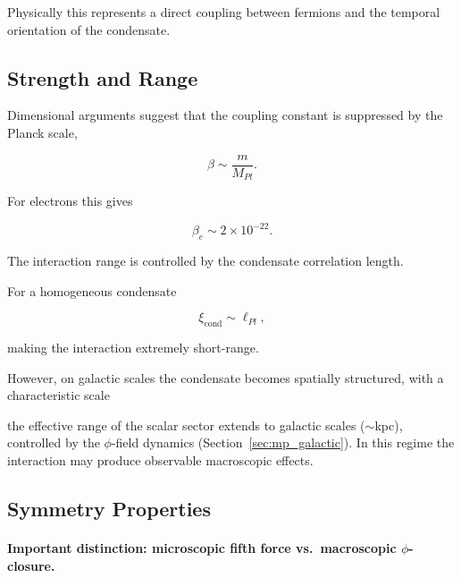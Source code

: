 \documentclass[11pt,a4paper]{article}
\numberwithin{equation}{section}
\begin{document}
Physically this represents a direct coupling between fermions and the
temporal orientation of the condensate.

\subsection{Strength and Range}

Dimensional arguments suggest that the coupling constant is suppressed
by the Planck scale,

\begin{equation}
\beta \sim \frac{m}{M_{Pl}} .
\end{equation}

For electrons this gives

\begin{equation}
\beta_e \sim 2\times10^{-22}.
\end{equation}

The interaction range is controlled by the condensate correlation
length.

For a homogeneous condensate

\begin{equation}
\xi_{\text{cond}} \sim \ell_{Pl},
\end{equation}

making the interaction extremely short-range.

However, on galactic scales the condensate becomes spatially
structured, with a characteristic scale

the effective range of the scalar sector extends to galactic
scales ($\sim$kpc), controlled by the $\phi$-field dynamics
(Section~\ref{sec:mp_galactic}).
In this regime the interaction may produce observable macroscopic
effects.

\subsection{Symmetry Properties}


\paragraph{Important distinction: microscopic fifth force
vs.\ macroscopic $\phi$-closure.}
\end{document}
